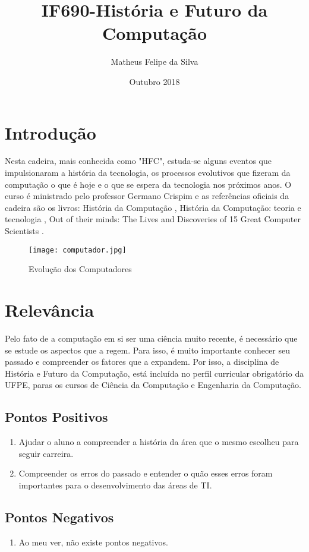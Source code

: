 \documentclass{article}
\title{IF690-História e Futuro da Computação}
\author{Matheus Felipe da Silva}
\date{Outubro 2018}
\begin{document}
\maketitle

\section{Introdução}
Nesta cadeira, mais conhecida como "HFC", estuda-se alguns eventos que impulsionaram a história da tecnologia, os processos evolutivos que fizeram da computação o que é hoje e o que se espera da tecnologia nos próximos anos.
O curso é ministrado pelo professor Germano Crispim e as referências oficiais da cadeira são os livros:  História da Computação \cite{historia2}, História da Computação: teoria e tecnologia \cite{historia}, Out of their minds: The Lives and Discoveries of 15 Great Computer Scientists \cite{historia1}. 

\begin{figure}[h!]
\centering
\texttt{[image: computador.jpg]}
\caption{Evolução dos Computadores}
\label{fig:computador}
\end{figure}

\section{Relevância}
Pelo fato de a computação em si ser uma ciência muito recente, é necessário que se estude os aspectos que a regem. Para isso, é muito importante conhecer seu passado e compreender os fatores que a expandem. Por isso, a disciplina de História e Futuro da Computação, está incluída no perfil curricular obrigatório da UFPE, paras os cursos de Ciência da Computação e Engenharia da Computação.
\subsection{Pontos Positivos}
\begin{enumerate}
    \item 
    Ajudar o aluno a compreender a história da área que o mesmo escolheu para seguir carreira.
    \item
    Compreender os erros do passado e entender o quão esses erros foram importantes para o desenvolvimento das áreas de TI.
    
\end{enumerate}
\subsection{Pontos Negativos}
\begin{enumerate}
    \item 
    Ao meu ver, não existe pontos negativos.
\end{enumerate}
\end{document}
